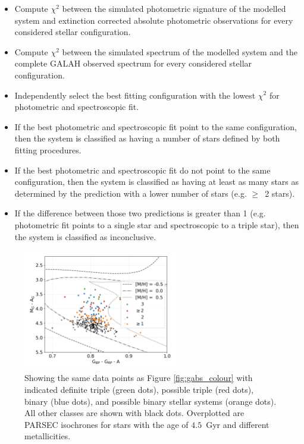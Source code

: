 \begin{itemize}
	\item Compute $\chi^2$ between the simulated photometric signature of the modelled system and extinction corrected absolute photometric observations for every considered stellar configuration. 
	\item Compute $\chi^2$ between the simulated spectrum of the modelled system and the complete GALAH observed spectrum for every considered stellar configuration. 
	\item Independently select the best fitting configuration with the lowest $\chi^2$ for photometric and spectroscopic fit.
	\item If the best photometric and spectroscopic fit point to the same configuration, then the system is classified as having a number of stars defined by both fitting procedures.
	\item If the best photometric and spectroscopic fit do not point to the same configuration, then the system is classified as having at least as many stars as determined by the prediction with a lower number of stars (e.g. $\geq$~2 stars).
	\item If the difference between those two predictions is greater than 1 (e.g. photometric fit points to a single star and spectroscopic to a triple star), then the system is classified as inconclusive. 
\end{itemize}

\begin{figure}
	\centering
	\includegraphics[width=0.6\textwidth]{mag_hr_gaia_bin-multi_iso_45Gyr_res_ebv_c3_07.png}
	\caption{Showing the same data points as Figure \ref{fig:gabs_colour} with indicated definite triple (green dots), possible triple (red dots), binary (blue dots), and possible binary stellar systems (orange dots). All other classes are shown with black dots. Overplotted are PARSEC isochrones \cite{2017ApJ...835...77M} for stars with the age of $4.5$~Gyr and different metallicities.}
	\label{fig:gabs_binmulti}
\end{figure}



